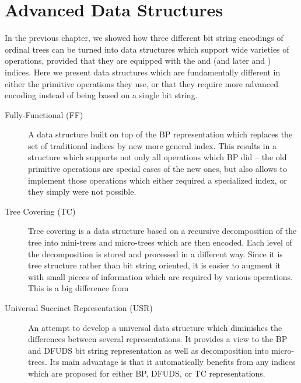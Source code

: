 \chapter{Advanced Data Structures}

In the previous chapter, we showed how three different bit string encodings of ordinal trees can be turned into data structures which support wide varieties of operations, provided that they are equipped with the \rank{} and \select{} (and later \match{} and \enclose{}) indices.
Here we present data structures which are fundamentally different in either the primitive operations they use, or that they require more advanced encoding instead of being based on a single bit string.

\begin{description}
	\item[Fully-Functional (FF)] 
	A data structure built on top of the BP representation which replaces the set of traditional indices by new more general index.
	This results in a structure which supports not only all operations which BP did -- the old primitive operations are special cases of the new ones, but also allows to implement those operations which either required a specialized index, or they simply were not possible.
	
	\item[Tree Covering (TC)]
	Tree covering is a data structure based on a recursive decomposition of the tree into mini-trees and micro-trees which are then encoded.
	Each level of the decomposition is stored and processed in a different way.
	Since it is tree structure rather than bit string oriented, it is easier to augment it with small pieces of information which are required by various operations.
	This is a big difference from
	
	\item[Universal Succinct Representation (USR)]
	An attempt to develop a universal data structure which diminishes the differences between several representations.
	It provides a view to the BP and DFUDS bit string representation as well as decomposition into micro-trees.
	Its main advantage is that it automatically benefits from any indices which are proposed for either BP, DFUDS, or TC representations.
\end{description}

